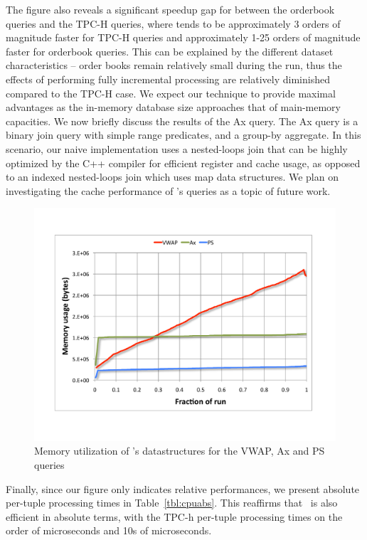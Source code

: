 The figure also reveals a significant speedup gap for \compiler between the
orderbook queries and the TPC-H queries, where \compiler tends to be
approximately 3 orders of magnitude faster for TPC-H queries and approximately
1-25 orders of magnitude faster for orderbook queries. This can be explained by
the different dataset characteristics -- order books remain relatively small
during the run, thus the effects of performing fully incremental processing are
relatively diminished compared to the TPC-H case. We expect our technique to
provide maximal advantages as the in-memory database size approaches that of
main-memory capacities.
We now briefly discuss the results of the Ax query. The
Ax query is a binary join query with simple range predicates, and a group-by
aggregate. In this scenario, our naive implementation uses a nested-loops join
that can be highly optimized by the C++ compiler for efficient register and
cache usage, as opposed to an indexed nested-loops join which uses map data
structures. We plan on investigating the cache performance of \compiler's
queries as a topic of future work.


\begin{figure}[htbp]
\vspace{-9mm}
\includegraphics[scale=0.31]{figures/orderbk-mem}
\vspace{-14mm}
\caption{Memory utilization of \compiler's datastructures for the VWAP, Ax and
  PS queries}
\label{fig:orderbkmem}
\end{figure}

Finally, since our figure only indicates relative performances, we present
absolute per-tuple processing times in Table~\ref{tbl:cpuabs}. This reaffirms
that \compiler\ is also efficient in absolute terms, with the TPC-h per-tuple
processing times on the order of microseconds and 10s of microseconds.

